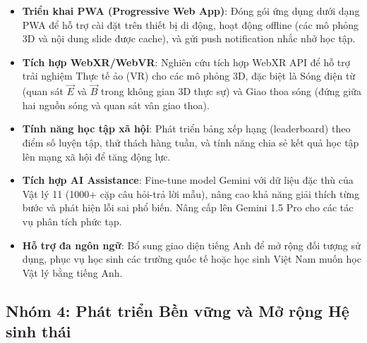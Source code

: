 \begin{itemize}
    \item \textbf{Triển khai PWA (Progressive Web App)}: Đóng gói ứng dụng dưới dạng PWA để hỗ trợ cài đặt trên thiết bị di động, hoạt động offline (các mô phỏng 3D và nội dung slide được cache), và gửi push notification nhắc nhở học tập.
    
    \item \textbf{Tích hợp WebXR/WebVR}: Nghiên cứu tích hợp WebXR API để hỗ trợ trải nghiệm Thực tế ảo (VR) cho các mô phỏng 3D, đặc biệt là Sóng điện từ (quan sát $\vec{E}$ và $\vec{B}$ trong không gian 3D thực sự) và Giao thoa sóng (đứng giữa hai nguồn sóng và quan sát vân giao thoa).
    
    \item \textbf{Tính năng học tập xã hội}: Phát triển bảng xếp hạng (leaderboard) theo điểm số luyện tập, thử thách hàng tuần, và tính năng chia sẻ kết quả học tập lên mạng xã hội để tăng động lực.
    
    \item \textbf{Tích hợp AI Assistance}: Fine-tune model Gemini với dữ liệu đặc thù của Vật lý 11 (1000+ cặp câu hỏi-trả lời mẫu), nâng cao khả năng giải thích từng bước và phát hiện lỗi sai phổ biến. Nâng cấp lên Gemini 1.5 Pro cho các tác vụ phân tích phức tạp.
    
    \item \textbf{Hỗ trợ đa ngôn ngữ}: Bổ sung giao diện tiếng Anh để mở rộng đối tượng sử dụng, phục vụ học sinh các trường quốc tế hoặc học sinh Việt Nam muốn học Vật lý bằng tiếng Anh.
\end{itemize}

\subsection{Nhóm 4: Phát triển Bền vững và Mở rộng Hệ sinh thái}


